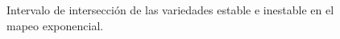\begin{figure}[htbp]
\centering
{}
\caption{Intervalo de intersección de las variedades estable e inestable en el mapeo exponencial.} \label{cruces_jung}
\end{figure}









